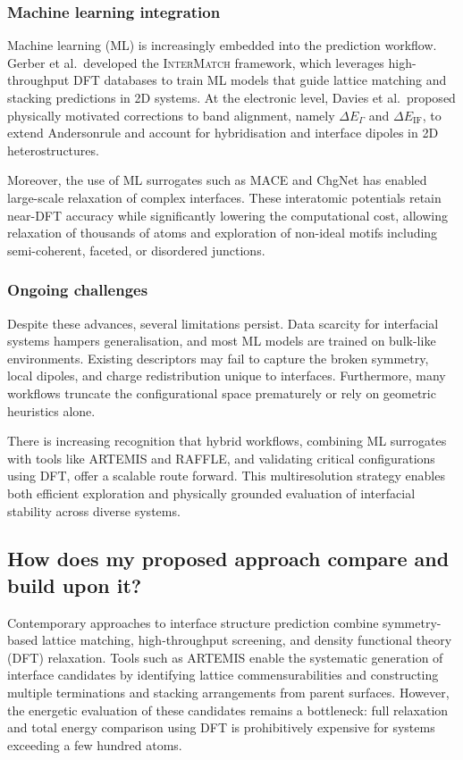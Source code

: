 \subsubsection{Machine learning integration}

Machine learning (ML) is increasingly embedded into the prediction workflow. Gerber et al.\ developed the
\textsc{InterMatch} framework, which leverages high-throughput DFT databases to train ML models that guide lattice
matching and stacking predictions in 2D systems. At the electronic level, Davies et al.\ proposed physically motivated
corrections to band alignment, namely $\Delta E_\Gamma$ and $\Delta E_{\mathrm{IF}}$, to extend Anderson\rqss rule and account for
hybridisation and interface dipoles in 2D heterostructures.

Moreover, the use of ML surrogates such as MACE and ChgNet has enabled large-scale relaxation of complex interfaces.
These interatomic potentials retain near-DFT accuracy while significantly lowering the computational cost, allowing
relaxation of thousands of atoms and exploration of non-ideal motifs including semi-coherent, faceted, or disordered
junctions.

\subsubsection{Ongoing challenges}

Despite these advances, several limitations persist. Data scarcity for interfacial systems hampers generalisation, and
most ML models are trained on bulk-like environments. Existing descriptors may fail to capture the broken symmetry,
local dipoles, and charge redistribution unique to interfaces. Furthermore, many workflows truncate the configurational
space prematurely or rely on geometric heuristics alone.

There is increasing recognition that hybrid workflows, combining ML surrogates with tools like \textsc{ARTEMIS} and
\textsc{RAFFLE}, and validating critical configurations using DFT, offer a scalable route forward. This multiresolution
strategy enables both efficient exploration and physically grounded evaluation of interfacial stability across diverse
systems.

\subsection{How does my proposed approach compare and build upon it?}

Contemporary approaches to interface structure prediction combine symmetry-based lattice matching, high-throughput
screening, and density functional theory (DFT) relaxation. Tools such as \textsc{ARTEMIS} enable the systematic
generation of interface candidates by identifying lattice commensurabilities and constructing multiple terminations and
stacking arrangements from parent surfaces. However, the energetic evaluation of these candidates remains a bottleneck:
full relaxation and total energy comparison using DFT is prohibitively expensive for systems exceeding a few hundred
atoms.

